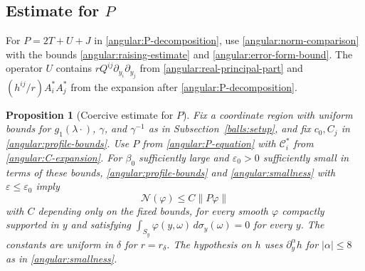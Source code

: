 \documentclass[11pt,a4paper]{article}
\newtheorem{proposition}[theorem]{Proposition}
\theoremstyle{definition}
\theoremstyle{remark}
\newcommand{\eps}{\varepsilon}
\numberwithin{equation}{section}
\begin{document}
\subsection{Estimate for \texorpdfstring{$P$}{P}}

For $P=2T+U+J$ in \eqref{angular:P-decomposition}, use
\eqref{angular:norm-comparison} with the bounds
\eqref{angular:raising-estimate} and \eqref{angular:error-form-bound}.
The operator $U$ contains
$rQ^{ij}\partial_{y_i}\partial_{y_j}$ from
\eqref{angular:real-principal-part} and $(h^{ij}/r)A_i^*A_j^*$ from
the expansion after \eqref{angular:P-decomposition}.

\begin{proposition}[Coercive estimate for $P$]
\label{angular:coercivity}
Fix a coordinate region with uniform bounds for $g_1(\lambda\cdot)$,
$\gamma$, and $\gamma^{-1}$ as in Subsection~\ref{balls:setup}, and
fix $c_0,C_j$ in \eqref{angular:profile-bounds}. Use $P$ from
\eqref{angular:P-equation} with $\mathcal C_i^*$ from
\eqref{angular:C-expansion}. For $\beta_0$ sufficiently large and
$\eps_0>0$ sufficiently small in terms of these bounds,
\eqref{angular:profile-bounds} and \eqref{angular:smallness} with
$\eps\le\eps_0$ imply
\begin{equation}\label{angular:coercive-estimate}
 \mathcal N(\varphi)\le C\|P\varphi\|
\end{equation}
with $C$ depending only on the fixed bounds, for every smooth
$\varphi$ compactly supported in $y$ and satisfying
$\int_{S_y}\varphi(y,\omega)\,d\sigma_y(\omega)=0$ for every $y$.
The constants are uniform in $\delta$ for $r=r_\delta$.
The hypothesis on $h$ uses $\partial_y^\alpha h$ for $|\alpha|\le8$
as in \eqref{angular:smallness}.
\end{proposition}
\end{document}
